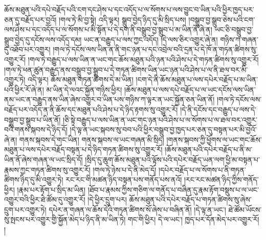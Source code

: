 ཆོས་མཐུན་པའི་དཔེ་བརྗོད་པའི་ངག་དང་ཤེས་པ་དང་འདོད་པ་ལ་སོགས་པ་ལས་བྱུང་བ་ཡིན་པའི་ཕྱིར་ཁྱད་པར་ཅན་དུ་བརྗོད་པར་བྱའོ། །གལ་ཏེ་མི་བྱ་སྟེ། འདི་ལྟར། སྒྲུབ་བྱེད་ཉིད་དུ་མི་སྲིད་པས། །བསྒྲུབ་བྱ་སྒྲུབ་ཅེས་པའི་ངག་ལས་ཤེས་པ་དང་འདོད་པ་ལ་སོགས་པ་མི་སྟོན་པ་དེ་དག་ནི་བསྒྲུབ་བྱ་སྒྲུབ་པ་མ་ཡིན་ནོ་ཞེ་ན། ཡང་ཅི་བསྒྲུབ་བྱ་སྒྲུབ་བྱེད་དུ་དངོས་ལས་འདོད་དམ། ཡང་ན་བརྒྱུད་པ་ལས་ཀྱང་འདོད། །དེ་ལས་ཅིར་འགྱུར་ཞེ་ན། གཉིས་ཀ་གཞན་དུ་འཐོབ་པར་འགྱུར། །གལ་ཏེ་དངོས་ལས་ཡིན་ན་ནི་གང་ཉན་པ་དང་འབྲེལ་བའི་དྲན་པ་དེ་ཁོ་ན་གཏན་ཚིགས་སུ་འགྱུར་རོ། །གལ་ཏེ་བརྒྱུད་པ་ལས་ཡིན་ན་ཡང་གང་ཆོས་མཐུན་པའི་ཉན་པའི་ཤེས་པ་དེ་གཏན་ཚིགས་སུ་འགྱུར་རོ། །གལ་ཏེ་ཕན་ཚུན་བརྒྱུད་ནས་བསྒྲུབ་བྱ་སྒྲུབ་པ་དེ་གཏན་ཚིགས་ཡིན་ཡང་ཉན་པའི་ཤེས་པ་ལ་ནི་ཐལ་བར་མི་འགྱུར་ཏེ། འདི་ལྟར། ཆོས་མཐུན་གཏན་ཚིགས་དེ་མ་ཡིན། །ངག་དེ་ནི་ཆོས་མཐུན་པ་ལས་དཔེར་བརྗོད་པ་མ་ཡིན་པའི་ཕྱིར་རོ་ཞེ་ན། མ་ཡིན་དེ་ལའང་སྐྱོན་གཉིས་ཕྱིར། །ཆོས་མཐུན་པ་ལས་དཔེ་བརྗོད་པ་ལ་ཡང་དངོས་ལས་ཡིན་ནམ་ཡང་ན་བརྒྱུད་ནས་ཡིན་ཞེས་འགྱུར་བ་ཡིན་པས་གཉིས་ཀ་ལྟར་ན་ཡང་སྐྱོན་ཅན་ཡིན་ནོ། །གལ་ཏེ་དངོས་ལས་བརྗོད་པར་འདོད་ན་ནི་ཆོས་དང་མཐུན་པའི་ཤེས་པ་དེ་ཉིད་རྟགས་སུ་འགྱུར་རོ། །དེ་ནི་དངོས་དང་བརྒྱུད་པ་ལས་དེ་བསྒྲུབ་བྱ་སྒྲུབ་པ་ཡིན་ནོ། །ཅི་སྟེ་བརྒྱུད་པ་ལས་ཡིན་ན་ཡང་གང་ཉན་པའི་ཤེས་པ་ལ་སོགས་པ་ལ་ཐལ་བར་འགྱུར་བའི་གནས་སྐབས་དེ་ཉིད་དོ། །དེ་ལྟ་ན་ཡང་སྐབས་སུ་བབ་པའི་ཕྱིར་བསྒྲུབ་བྱ་ཁྱད་པར་ཅན་དུ་བསྟན་པར་མི་བྱའོ་ཞེ་ན། གནས་སྐབས་དེ་གང་ཡིན། གནས་སྐབས་ལ་ཡང་གཞན་མི་སྲིད། །གནས་སྐབས་ཀྱི་ཕྱོགས་ལ་ཡང་གང་ཆོས་མཐུན་པ་ལས་དཔེར་བརྗོད་བསྟན་པ་དེ་ཉིད་གཏན་ཚིགས་སུ་འགྱུར་རོ། །ཆོས་མཐུན་པའི་དཔེར་བརྗོད་པ་ནི་མ་ཡིན་ནོ་ཞེས་གཞན་ལ་ཡང་སྲིད་དོ། །སྲིད་དུ་ཆུག་ཆོས་མཐུན་པའི་ལྟོས་པའི་དཔེར་བརྗོད་ཡན་ལག་ཕྱི་མ་བསྟན་པ་རྣམས་ཀྱང་གཏན་ཚིགས་སུ་འགྱུར་རོ། །གལ་ཏེ་ཉེས་པ་དེ་ནི་མེད་དོ། །དཔེར་བརྗོད་པ་ལ་སོགས་པ་ནི་གཏན་ཚིགས་ཉིད་དུ་མི་འགྱུར་ཏེ། རང་རང་གི་མཚན་ཉིད་བསྟན་པས་གནོད་པས་ནའོ། །རང་རང་མཚན་ཉིད་ཀྱིས་གནོད་ཕྱིར། །རྣམ་པར་རྟོག་པ་སྲིད་མ་ཡིན། །ཐོབ་པ་རྣམས་ཀྱིས་གཅིག་ལ་གནོད་པ་བཞིན་དུ་རྣམ་རྟོག་བསྡུས་པ་ལ་ཡང་འགྱུར་བའི་ཕྱིར་ཐེ་ཚོམ་དུ་འགྱུར་རོ། །དེ་ཕྱིར་དྲུག་པར། ཆོས་མཐུན་པའི་དཔེར་བརྗོད་པ་གཏན་ཚིགས་སུ་ཞེས་དྲུག་པར་འགྱུར་ཏེ། དཔེར་ན་གཞན་ལ་ཆོས་དེའི་གཏན་ཚིགས་སོ་ཞེས་པ་བཞིན་ནོ། །དེ་ལྟ་ན་ཡང་། ཐེ་ཚོམ་ཡོངས་སུ་སྤངས་པར་འགྱུར་གྱི་སྐྱོན་མེད་པ་ཉིད་ནི་མ་ཡིན་ཏེ། གང་གི་ཕྱིར། དེ་ལ་ཡང་། ཁྱད་པར་དོན་མེད་པར་འགྱུར་རོ། །
